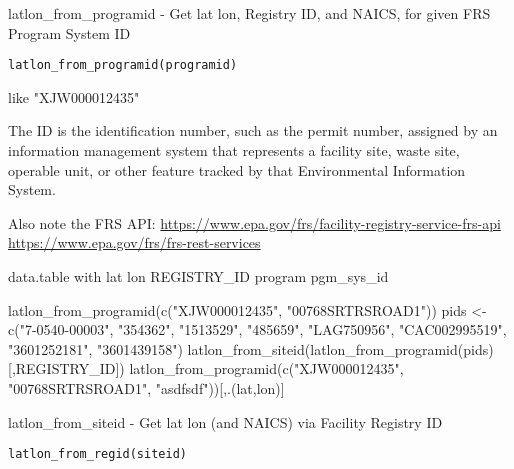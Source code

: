 \documentclass[a4paper]{book}
\begin{document}
%
\begin{Description}\relax
latlon\_from\_programid - Get lat lon, Registry ID, and NAICS, for given FRS Program System ID
\end{Description}
%
\begin{Usage}
\begin{verbatim}
latlon_from_programid(programid)
\end{verbatim}
\end{Usage}
%
\begin{Arguments}
\begin{ldescription}
\item[\code{programid}] like "XJW000012435"
\end{ldescription}
\end{Arguments}
%
\begin{Details}\relax
The ID is the identification number, such as the permit number,
assigned by an information management system that represents a
facility site, waste site, operable unit, or other feature tracked by that
Environmental Information System.

Also note the FRS API:
\url{https://www.epa.gov/frs/facility-registry-service-frs-api}
\url{https://www.epa.gov/frs/frs-rest-services}
\end{Details}
%
\begin{Value}
data.table with lat  lon  REGISTRY\_ID  program   pgm\_sys\_id
\end{Value}
%
\begin{Examples}
\begin{ExampleCode}
 latlon_from_programid(c("XJW000012435", "00768SRTRSROAD1"))
 pids <- c("7-0540-00003", "354362", "1513529", "485659", "LAG750956", 
   "CAC002995519", "3601252181", "3601439158")
 latlon_from_siteid(latlon_from_programid(pids)[,REGISTRY_ID])
 latlon_from_programid(c("XJW000012435", "00768SRTRSROAD1", "asdfsdf"))[,.(lat,lon)]
 
\end{ExampleCode}
\end{Examples}
%
\begin{Description}\relax
latlon\_from\_siteid - Get lat lon (and NAICS) via Facility Registry ID
\end{Description}
%
\begin{Usage}
\begin{verbatim}
latlon_from_regid(siteid)
\end{verbatim}
\end{Usage}
\end{document}
